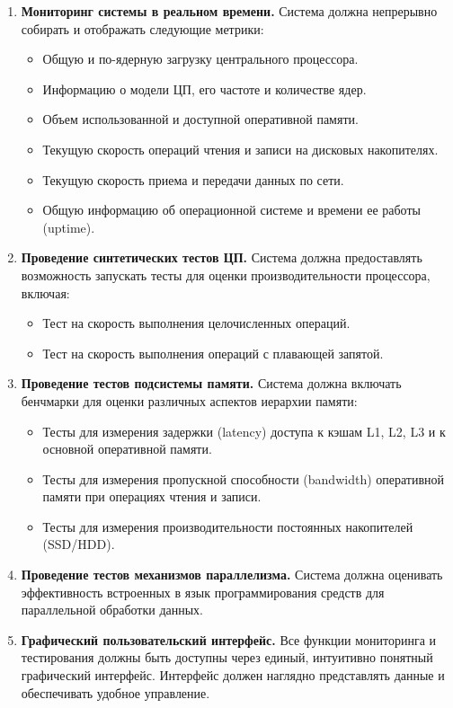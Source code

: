 \begin{enumerate}
    \item \textbf{Мониторинг системы в реальном времени.} Система должна непрерывно собирать и отображать следующие метрики:
    \begin{itemize}
        \item Общую и по-ядерную загрузку центрального процессора.
        \item Информацию о модели ЦП, его частоте и количестве ядер.
        \item Объем использованной и доступной оперативной памяти.
        \item Текущую скорость операций чтения и записи на дисковых накопителях.
        \item Текущую скорость приема и передачи данных по сети.
        \item Общую информацию об операционной системе и времени ее работы (uptime).
    \end{itemize}
    
    \item \textbf{Проведение синтетических тестов ЦП.} Система должна предоставлять возможность запускать тесты для оценки производительности процессора, включая:
    \begin{itemize}
        \item Тест на скорость выполнения целочисленных операций.
        \item Тест на скорость выполнения операций с плавающей запятой.
    \end{itemize}
    
    \item \textbf{Проведение тестов подсистемы памяти.} Система должна включать бенчмарки для оценки различных аспектов иерархии памяти:
    \begin{itemize}
        \item Тесты для измерения задержки (latency) доступа к кэшам L1, L2, L3 и к основной оперативной памяти.
        \item Тесты для измерения пропускной способности (bandwidth) оперативной памяти при операциях чтения и записи.
        \item Тесты для измерения производительности постоянных накопителей (SSD/HDD).
    \end{itemize}

    \item \textbf{Проведение тестов механизмов параллелизма.} Система должна оценивать эффективность встроенных в язык программирования средств для параллельной обработки данных.
    
    \item \textbf{Графический пользовательский интерфейс.} Все функции мониторинга и тестирования должны быть доступны через единый, интуитивно понятный графический интерфейс. Интерфейс должен наглядно представлять данные и обеспечивать удобное управление.
\end{enumerate}

